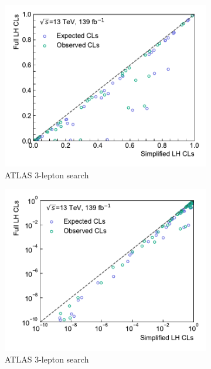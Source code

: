 \begin{figure}
\begin{subfigure}[b]{0.5\textwidth}
		\centering\includegraphics[width=\textwidth]{cls_scatter_3Loffshell_lin}
		\caption{ATLAS 3-lepton search}
	\end{subfigure}\hfill
	\begin{subfigure}[b]{0.5\textwidth}
		\centering\includegraphics[width=\textwidth]{cls_scatter_3Loffshell_log}
		\caption{ATLAS 3-lepton search}
	\end{subfigure}\hfill
	\begin{subfigure}[b]{0.5\textwidth}

\end{subfigure}
\end{figure}
